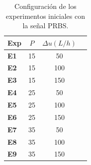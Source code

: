 \documentclass[11pt]{report}
\begin{document}
\begin{table}[H]
\caption{Configuración de los experimentos iniciales con la señal PRBS.}
\label{tab:expPRBS}
\centering
\begin{tabular}{|l|c|c|c|}
\hline
\textbf{Exp} &  \textbf{$P$} & \textbf{$\Delta u(L/h)$} \\ \hline
\textbf{E1}  & 15         & 50               \\ \hline
\textbf{E2}  & 15         & 100              \\ \hline
\textbf{E3}  & 15         & 150              \\ \hline
\textbf{E4}  & 25         & 50               \\ \hline
\textbf{E5}  & 25         & 100              \\ \hline
\textbf{E6}  & 25         & 150              \\ \hline
\textbf{E7}  & 35         & 50               \\ \hline
\textbf{E8}  & 35         & 100              \\ \hline
\textbf{E9}  & 35         & 150              \\ \hline
\end{tabular}
\end{table}

 
\end{document}
